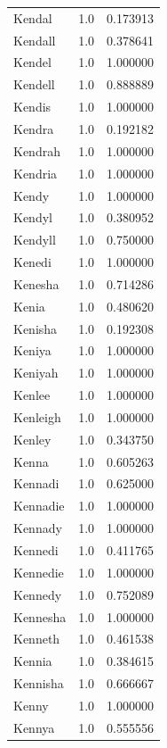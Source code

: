 \documentclass[
  letterpaper,
  DIV=11,
  numbers=noendperiod]{scrreprt}
\begin{document}
\begin{tabular}{lrr}
Kendal          &   1.0 &   0.173913 \\
Kendall         &   1.0 &   0.378641 \\
Kendel          &   1.0 &   1.000000 \\
Kendell         &   1.0 &   0.888889 \\
Kendis          &   1.0 &   1.000000 \\
Kendra          &   1.0 &   0.192182 \\
Kendrah         &   1.0 &   1.000000 \\
Kendria         &   1.0 &   1.000000 \\
Kendy           &   1.0 &   1.000000 \\
Kendyl          &   1.0 &   0.380952 \\
Kendyll         &   1.0 &   0.750000 \\
Kenedi          &   1.0 &   1.000000 \\
Kenesha         &   1.0 &   0.714286 \\
Kenia           &   1.0 &   0.480620 \\
Kenisha         &   1.0 &   0.192308 \\
Keniya          &   1.0 &   1.000000 \\
Keniyah         &   1.0 &   1.000000 \\
Kenlee          &   1.0 &   1.000000 \\
Kenleigh        &   1.0 &   1.000000 \\
Kenley          &   1.0 &   0.343750 \\
Kenna           &   1.0 &   0.605263 \\
Kennadi         &   1.0 &   0.625000 \\
Kennadie        &   1.0 &   1.000000 \\
Kennady         &   1.0 &   1.000000 \\
Kennedi         &   1.0 &   0.411765 \\
Kennedie        &   1.0 &   1.000000 \\
Kennedy         &   1.0 &   0.752089 \\
Kennesha        &   1.0 &   1.000000 \\
Kenneth         &   1.0 &   0.461538 \\
Kennia          &   1.0 &   0.384615 \\
Kennisha        &   1.0 &   0.666667 \\
Kenny           &   1.0 &   1.000000 \\
Kennya          &   1.0 &   0.555556 \\

\end{tabular}
\end{document}
